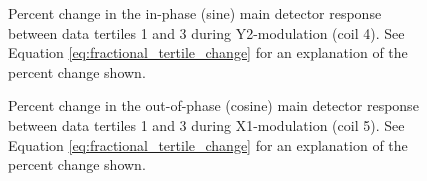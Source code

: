 \begin{figure}[h]

\centering
{}
\caption{Percent change in the in-phase (sine) main detector response between data tertiles 1 and 3 during Y2-modulation (coil 4). See Equation \ref{eq:fractional_tertile_change} for an explanation of the percent change shown.}
\label{fig:tert_md_coeff_coil4}
\end{figure}
\begin{figure}[h]

\centering
{}
\caption{Percent change in the out-of-phase (cosine) main detector response between data tertiles 1 and 3 during X1-modulation (coil 5). See Equation \ref{eq:fractional_tertile_change} for an explanation of the percent change shown.}
\label{fig:tert_md_coeff_coil5}
\end{figure}
